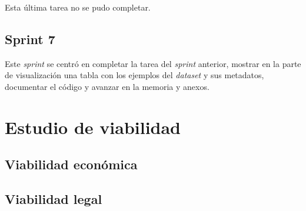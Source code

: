 Esta última tarea no se pudo completar.\\

\subsection{Sprint 7}
Este \textit{sprint} se centró en completar la tarea del \textit{sprint} anterior, mostrar en la parte de visualización una tabla con los ejemplos del \textit{dataset} y sus metadatos, documentar el código y avanzar en la memoria y anexos.\\

\section{Estudio de viabilidad}

\subsection{Viabilidad económica}

\subsection{Viabilidad legal}


